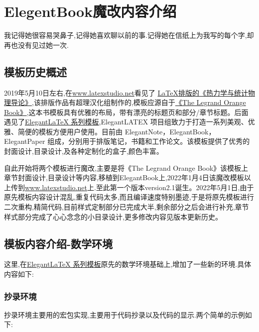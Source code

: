 \chapter{ElegentBook魔改内容介绍}
\begin{center}
    \textcolor[RGB]{255, 0, 0}{\faHeart}我记得她很容易哭鼻子,记得她喜欢聊以前的事.记得她在信纸上为我写的每个字,却再也没有见过她一次.\textcolor[RGB]{255, 0, 0}{\faHeart}
\end{center}
\vspace{-5pt}
\begin{center}
\end{center}

\section{模板历史概述}
2019年5月10日左右,在\href{latexstudio论坛}{www.latexstudio.net}看见了
\href{https://www.latexstudio.net/archives/10715.html}{LaTeX排版的《热力学与统计物理导论》},该排版作品有超理汉化组制作的,模板应源自于\href{http://www.latextemplates.com/template/the-legrand-orange-book}{《The Legrand Orange Book》},这本书模板具有优雅的布局，带有漂亮的标题页和部分/章节标题。后面遇见了\href{https://elegantlatex.org/}{Elegant\LaTeX{} 系列模板},ElegantLATEX 项目组致力于打造一系列美观、优雅、简便的模板方便用户使用。目前由
ElegantNote，ElegantBook，ElegantPaper 组成，分别用于排版笔记，书籍和工作论文。该模板提供了优秀的封面设计,目录设计,及各种定制化的盒子,颜色丰富。

自此开始将两个模板进行魔改,主要是将《The Legrand Orange Book》该模板上章节封面设计,目录设计等内容,移植到ElegantBook上,2022年1月4日该魔改模板以上传到\href{latexstudio论坛}{www.latexstudio.net}上.至此第一个版本version2.1诞生。2022年5月1日,由于原先模板内容设计混乱,重复代码太多,而且编译速度特别墨迹,于是将原先模板进行二次重构,精简代码,目前样式定制部分已完成大半,剩余部分之后会进行补充,章节样式部分完成了心心念念的小目录设计,更多修改内容见版本更新历史。

\section{模板内容介绍-数学环境}
这里,在\href{https://elegantlatex.org/}{Elegant\LaTeX{} 系列模板}原先的数学环境基础上,增加了一些新的环境.具体内容如下:

\subsection{抄录环境}
抄录环境主要用的宏包实现,主要用于代码抄录以及代码的显示.两个简单的示例如下:

